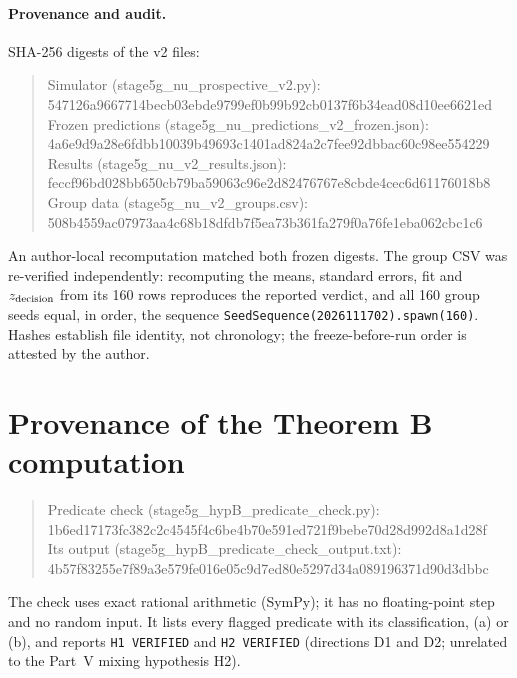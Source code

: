 \documentclass[11pt]{article}
\theoremstyle{remark}\newtheorem{remark}[theorem]{Remark}
\begin{document}
\paragraph{Provenance and audit.} SHA-256 digests of the v2 files:
\begin{quote}\footnotesize\ttfamily
Simulator (stage5g\_nu\_prospective\_v2.py):\\ 547126a9667714becb03ebde9799ef0b99b92cb0137f6b34ead08d10ee6621ed\\
Frozen predictions (stage5g\_nu\_predictions\_v2\_frozen.json):\\ 4a6e9d9a28e6fdbb10039b49693c1401ad824a2c7fee92dbbac60c98ee554229\\
Results (stage5g\_nu\_v2\_results.json):\\ feccf96bd028bb650cb79ba59063c96e2d82476767e8cbde4cec6d61176018b8\\
Group data (stage5g\_nu\_v2\_groups.csv):\\ 508b4559ac07973aa4c68b18dfdb7f5ea73b361fa279f0a76fe1eba062cbc1c6
\end{quote}
An author-local recomputation matched both frozen digests. The group CSV was re-verified independently: recomputing the means, standard errors, fit and $z_{\rm decision}$ from its 160 rows reproduces the reported verdict, and all 160 group seeds equal, in order, the sequence \texttt{SeedSequence(2026111702)}\allowbreak\texttt{.spawn(160)}. Hashes establish file identity, not chronology; the freeze-before-run order is attested by the author.

\section{Provenance of the Theorem B computation}\label{sec:prov}
\begin{quote}\footnotesize\ttfamily
Predicate check (stage5g\_hypB\_predicate\_check.py):\\ 1b6ed17173fc382c2c4545f4c6be4b70e591ed721f9bebe70d28d992d8a1d28f\\
Its output (stage5g\_hypB\_predicate\_check\_output.txt):\\ 4b57f83255e7f89a3e579fe016e05c9d7ed80e5297d34a089196371d90d3dbbc
\end{quote}
The check uses exact rational arithmetic (SymPy); it has no floating-point step and no random input. It lists every flagged predicate with its classification, (a) or (b), and reports \texttt{H1 VERIFIED} and \texttt{H2 VERIFIED} (directions D1 and D2; unrelated to the Part~V mixing hypothesis H2).
\end{document}
